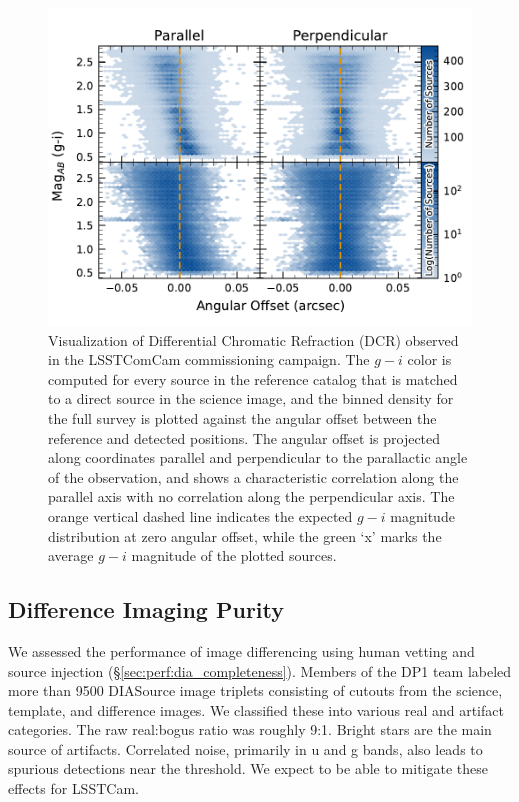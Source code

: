 \begin{figure}[htb!]
\centering
\includegraphics[width=0.98\linewidth]{dcrHexbin.pdf}
\caption{Visualization of \gls{Differential Chromatic Refraction} (DCR) observed in the  LSSTComCam commissioning campaign. The $g-i$ color is computed for every source in the reference catalog that is matched to a direct source in the science image, and the binned density for the full survey is plotted against the angular offset between the reference and detected positions. The angular offset is projected along coordinates parallel and perpendicular to the parallactic angle of the observation, and shows a characteristic correlation along the parallel axis with no correlation along the perpendicular axis. The orange vertical dashed line indicates the expected $g-i$ magnitude distribution at zero angular offset, while the green ‘x’ marks the average $g-i$ magnitude of the plotted sources.}
\label{fig:dcr}
\vspace{0.1cm}
\end{figure}


\subsection{Difference Imaging Purity} \label{sec:performance:dia}

We assessed the performance of image differencing using human vetting and source injection (\S \ref{sec:perf:dia_completeness}).
Members of the \gls{DP1} team labeled more than 9500 DIASource image triplets consisting of cutouts from the science, template, and difference images.
We classified these into various real and artifact categories.
The raw real:bogus ratio was roughly 9:1.
Bright stars are the main source of artifacts.
Correlated noise, primarily in u and g bands, also leads to spurious detections near the threshold.
We expect to be able to mitigate these effects for \gls{LSSTCam}.

